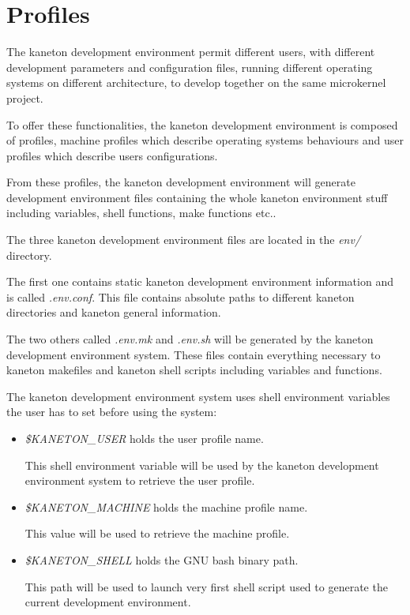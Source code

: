 \section{Profiles}

The kaneton development environment permit different users, with different
development parameters and configuration files, running different operating
systems on different architecture, to develop together on the same
microkernel project.

To offer these functionalities, the kaneton development environment is
composed of profiles, machine profiles which describe operating systems
behaviours and user profiles which describe users configurations.

From these profiles, the kaneton development environment will generate
development environment files containing the whole kaneton environment
stuff including variables, shell functions, make functions etc..

The three kaneton development environment files are located in the
\textit{env/} directory.

The first one contains static kaneton development environment information
and is called \textit{.env.conf}. This file contains absolute paths
to different kaneton directories and kaneton general information.

The two others called \textit{.env.mk} and \textit{.env.sh} will be generated
by the kaneton development environment system. These files contain
everything necessary to kaneton makefiles and kaneton shell scripts
including variables and functions.

The kaneton development environment system uses shell environment variables
the user has to set before using the system:

\begin{itemize}
  \item
    \textit{\$KANETON\_USER} holds the user profile name.

    This shell environment variable will be used by the kaneton development
    environment system to retrieve the user profile.
  \item
    \textit{\$KANETON\_MACHINE} holds the machine profile name.

    This value will be used to retrieve the machine profile.
  \item
    \textit{\$KANETON\_SHELL} holds the GNU bash binary path.

    This path will be used to launch very first shell script used to
    generate the current development environment.
\end{itemize}

